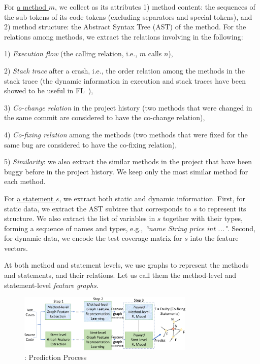 For \underline{a method $m$}, we collect as its attributes 1) method
content: the sequences of the sub-tokens of its code tokens (excluding
separators and special tokens), and 2) method structure: the Abstract
Syntax Tree (AST) of the method. For the relations among methods, we
extract the relations involving in the following:

1) {\em Execution flow} (the calling relation, i.e., $m$ calls $n$),

2) {\em Stack trace} after a crash, i.e., the order relation among the
methods in the stack trace (the dynamic information in execution
and stack traces have been showed to be useful in
FL~\cite{icse21-fl,DeepFL}),

3) {\em Co-change relation} in the project history (two methods that
were changed in the same commit are considered to have the co-change
relation),

4) {\em Co-fixing relation} among the methods (two methods that were
fixed for the same bug are considered to have the co-fixing relation),

5) {\em Similarity}: we also extract the similar methods in the
project that have been buggy before in the project history.
We keep only the most similar method for each method.


For \underline{a statement $s$}, we extract both static and dynamic
information. First, for static data, we extract the AST subtree that
corresponds to $s$ to represent its structure. We also extract the
list of variables in $s$ together with their types, forming a sequence
of names and types, e.g., {\em ``name String price int ..."}.  Second,
for dynamic data, we encode the test coverage matrix for $s$ into the
feature vectors.
%

At both method and statement levels, we use graphs to represent
the methods and statements, and their relations. Let us call
them the method-level and statement-level {\em feature graphs}.


\begin{figure}[t]
	\centering
	\includegraphics[width=3.3in]{graphs/overview-predict-2.png}
        \vspace{-10pt}
        \caption{{\tool}: Prediction Process}
	\label{predict-overview}
        \vspace{-6pt}
\end{figure}

